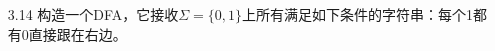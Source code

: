\documentclass[]{ctexart}
\begin{document}
\begin{enumerate}
	
	
	
	\item[3.14] 构造一个DFA，它接收$\Sigma=\{0,1\}$上所有满足如下条件的字符串：每个1都有0直接跟在右边。
	
		
\end{enumerate}
\end{document}
